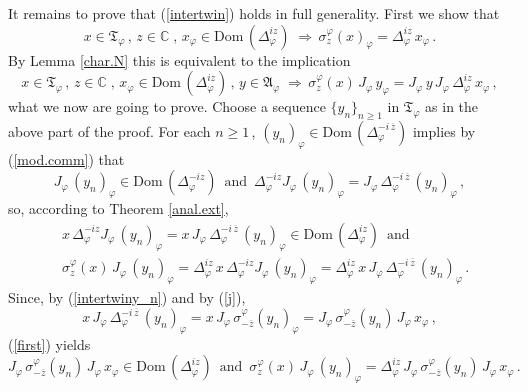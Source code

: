 \documentclass[reqno]{amsart}
\theoremstyle{definition}
\theoremstyle{remark}
\numberwithin{equation}{section}
\theoremstyle{plain}
\begin{document}
It remains to prove that (\ref{intertwin}) holds in full generality.
First we show that
\begin{equation}\label{part.intertwin}
x\in\mathfrak T_\varphi\, ,\,    
z\in\mathbb C\; ,\, x_\varphi\in\text{Dom}\, (\Delta_\varphi^{i z})\;
\Longrightarrow\,\sigma^\varphi_z (x)_\varphi =\Delta_\varphi^{i z}\,
x_\varphi\, .
\end{equation}
By Lemma \ref{char.N} this is equivalent to the implication
\begin{equation*}
x\in\mathfrak T_\varphi\, ,\,    
z\in\mathbb C\; ,\, x_\varphi\in\text{Dom}\, (\Delta_\varphi^{i z})
\, ,\, y\in\mathfrak A_\varphi\;\Longrightarrow\,\sigma^\varphi_z (x)
\, J_\varphi\, y_\varphi =J_\varphi\, y\, J_\varphi\,
\Delta_\varphi^{i z}\, x_\varphi\, ,
\end{equation*}
what we now are going to prove. Choose a sequence
$\{ y_n\}_{n\geq 1}$ in $\mathfrak T_\varphi$ as in the above part
of the proof. For each $n\geq 1\,$, $(y_n)_\varphi\in\text{Dom}\,
(\Delta_\varphi^{-i\,\overline{z}})$ implies by (\ref{mod.comm}) that
\begin{equation*}
J_\varphi\, (y_n)_\varphi\in\text{Dom}\, (\Delta_\varphi^{-i z})\,
\text{ and }\,\Delta_\varphi^{-i z} J_\varphi\, (y_n)_\varphi =
J_\varphi\,\Delta_\varphi^{-i\,\overline{z}}\, (y_n)_\varphi\, ,
\end{equation*}
so, according to Theorem \ref{anal.ext},
\begin{equation}\label{first}
\begin{split}
&x\,\Delta_\varphi^{-i z} J_\varphi\, (y_n)_\varphi =
x\, J_\varphi\,\Delta_\varphi^{-i\,\overline{z}}\, (y_n)_\varphi
\in\text{Dom}\, (\Delta_\varphi^{i z})\,\text{ and} \\
&\sigma^\varphi_z (x)\, J_\varphi\, (y_n)_\varphi =
\Delta_\varphi^{i z}\, x\,\Delta_\varphi^{-i z} J_\varphi\,
(y_n)_\varphi =\Delta_\varphi^{i z}\, x\, J_\varphi\,
\Delta_\varphi^{-i\,\overline{z}}\, (y_n)_\varphi\, .
\end{split}
\end{equation}
Since, by (\ref{intertwiny_n}) and by (\ref{j}),
\begin{equation*}
x\, J_\varphi\,\Delta_\varphi^{-i\,\overline{z}}\, (y_n)_\varphi =
x\, J_\varphi\,\sigma^\varphi_{-\overline{z}} (y_n)_\varphi =
J_\varphi\, \sigma^\varphi_{-\overline{z}} (y_n)\, J_\varphi\,
x_\varphi\, ,
\end{equation*}
(\ref{first}) yields
\begin{equation*}
J_\varphi\, \sigma^\varphi_{-\overline{z}} (y_n)\, J_\varphi\,
x_\varphi\in\text{Dom}\, (\Delta_\varphi^{i z})\,\text{ and }\,
\sigma^\varphi_z (x)\, J_\varphi\, (y_n)_\varphi =
\Delta_\varphi^{i z}\, J_\varphi\,\sigma^\varphi_{-\overline{z}}
(y_n)\, J_\varphi\, x_\varphi\, .
\end{equation*}
\end{document}
